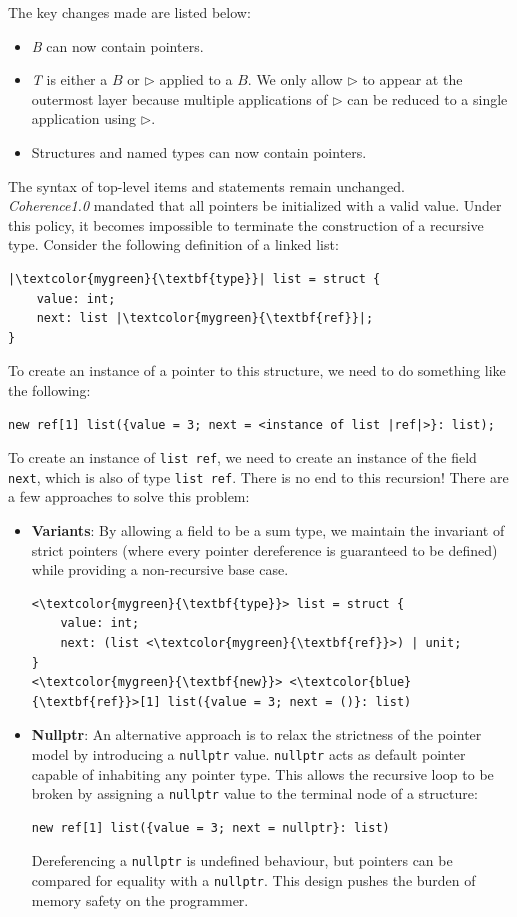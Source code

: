 The key changes made are listed below:
\begin{itemize}
  \item \textit{B} can now contain pointers.
  \item \textit{T} is either a $B$ or $\triangleright$ applied to a $B$. We only allow $\triangleright$ to appear at the outermost layer because multiple applications of $\triangleright$ can be reduced to a single application using $\triangleright$.
  \item Structures and named types can now contain pointers.
\end{itemize}
The syntax of top-level items and statements remain unchanged. \\
\textit{Coherence1.0} mandated that all pointers be initialized with a valid value. Under this policy, it becomes impossible to terminate the construction of a recursive type. Consider the following definition of a linked list:
\begin{verbatim}
|\textcolor{mygreen}{\textbf{type}}| list = struct {
    value: int;
    next: list |\textcolor{mygreen}{\textbf{ref}}|;
}
\end{verbatim}
To create an instance of a pointer to this structure, we need to do something like the following:
\begin{verbatim}
new ref[1] list({value = 3; next = <instance of list |ref|>}: list);
\end{verbatim}
To create an instance of \texttt{list ref}, we need to create an instance of the field \texttt{next}, which is also of type \texttt{list ref}. There is no end to this recursion! There are a few approaches to solve this problem:
\begin{itemize}
  \item \textbf{Variants}: By allowing a field to be a sum type, we maintain the invariant of strict pointers (where every pointer dereference is guaranteed to be defined) while providing a non-recursive base case.
  \begin{verbatim}
<\textcolor{mygreen}{\textbf{type}}> list = struct {
    value: int;
    next: (list <\textcolor{mygreen}{\textbf{ref}}>) | unit;
}
<\textcolor{mygreen}{\textbf{new}}> <\textcolor{blue}{\textbf{ref}}>[1] list({value = 3; next = ()}: list)
  \end{verbatim}
  \item \textbf{Nullptr}: An alternative approach is to relax the strictness of the pointer model by introducing a \texttt{nullptr} value. \texttt{nullptr} acts as default pointer capable of inhabiting any pointer type. This allows the recursive loop to be broken by assigning a \texttt{nullptr} value to the terminal node of a structure:
  \begin{verbatim}
new ref[1] list({value = 3; next = nullptr}: list)
  \end{verbatim}
  Dereferencing a \texttt{nullptr} is undefined behaviour, but pointers can be compared for equality with a \texttt{nullptr}. This design pushes the burden of memory safety on the programmer.
\end{itemize}
